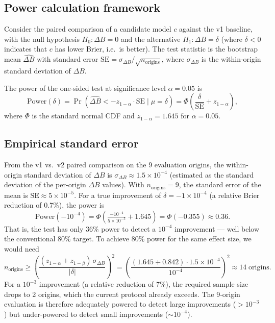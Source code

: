 \documentclass[10pt,a4paper,twocolumn]{article}
\begin{document}
\subsection{Power calculation framework}

Consider the paired comparison of a candidate model $c$ against the v1 baseline, with the null hypothesis $H_0: \Delta B = 0$ and the alternative $H_1: \Delta B = \delta$ (where $\delta < 0$ indicates that $c$ has lower Brier, i.e.\ is better). The test statistic is the bootstrap mean $\widehat{\Delta B}$ with standard error $\text{SE} = \sigma_{\Delta B} / \sqrt{n_{\text{origins}}}$, where $\sigma_{\Delta B}$ is the within-origin standard deviation of $\Delta B$.

The power of the one-sided test at significance level $\alpha = 0.05$ is
\begin{equation}\label{eq:power}
\text{Power}(\delta) = \Pr\!\left( \widehat{\Delta B} < -z_{1-\alpha} \cdot \text{SE} \mid \mu = \delta \right) = \Phi\!\left( \frac{\delta}{\text{SE}} + z_{1-\alpha} \right),
\end{equation}
where $\Phi$ is the standard normal CDF and $z_{1-\alpha} = 1.645$ for $\alpha = 0.05$.

\subsection{Empirical standard error}

From the v1 vs.\ v2 paired comparison on the 9 evaluation origins, the within-origin standard deviation of $\Delta B$ is $\sigma_{\Delta B} \approx 1.5 \times 10^{-4}$ (estimated as the standard deviation of the per-origin $\Delta B$ values). With $n_{\text{origins}} = 9$, the standard error of the mean is $\text{SE} \approx 5 \times 10^{-5}$. For a true improvement of $\delta = -1 \times 10^{-4}$ (a relative Brier reduction of 0.7\%), the power is
\begin{equation}\label{eq:power-example}
\text{Power}(-10^{-4}) = \Phi\!\left( \tfrac{-10^{-4}}{5 \times 10^{-5}} + 1.645 \right) = \Phi(-0.355) \approx 0.36.
\end{equation}
That is, the test has only 36\% power to detect a $10^{-4}$ improvement --- well below the conventional 80\% target. To achieve 80\% power for the same effect size, we would need
\begin{equation}\label{eq:sample-size}
n_{\text{origins}} \geq \left( \frac{(z_{1-\alpha} + z_{1-\beta})\, \sigma_{\Delta B}}{|\delta|} \right)^2 = \left( \frac{(1.645 + 0.842) \cdot 1.5 \times 10^{-4}}{10^{-4}} \right)^2 \approx 14 \;\text{origins}.
\end{equation}
For a $10^{-3}$ improvement (a relative reduction of 7\%), the required sample size drops to 2 origins, which the current protocol already exceeds. The 9-origin evaluation is therefore adequately powered to detect large improvements ($> 10^{-3}$) but under-powered to detect small improvements ($\sim 10^{-4}$).
\end{document}
